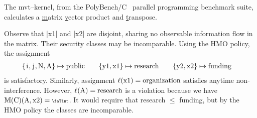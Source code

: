 \begin{example}
The mvt--kernel, from the {PolyBench/C}~\cite{polybenchc} parallel programming
benchmark suite, calculates a \underline{m}atrix \underline{v}ector product and
\underline{t}ranspose.

\begin{center}
\begin{minipage}{.55\textwidth}
\end{minipage}\hfill%
\begin{minipage}[b]{.40\textwidth}
\hfill\scalebox{.85}{$\begin{pNiceMatrix}[first-row,first-col]
& \prc|i|  & \prc|j| & \prc|N| & \prc|x1| & \prc|x2| & \prc|y1| & \prc|y2| & \prc|A| \\
\prc|i|   & \nv & \vi & \nv & \vi & \vi & \nv & \nv & \nv  \\
\prc|j|   & \nv & \nv & \nv & \vi & \vi & \nv & \nv & \nv  \\
\prc|N|   & \vi & \vi & \nv & \vi & \vi & \nv & \nv & \nv  \\
\prc|x1|  & \nv & \nv & \nv & \nv & \nv & \nv & \nv & \nv  \\
\prc|x2|  & \nv & \nv & \nv & \nv & \nv & \nv & \nv & \nv  \\
\prc|y1|  & \nv & \nv & \nv & \vi & \nv & \nv & \nv & \nv  \\
\prc|y2|  & \nv & \nv & \nv & \nv & \vi & \nv & \nv & \nv  \\
\prc|A|   & \nv & \nv & \nv & \vi & \vi & \nv & \nv & \nv  \\
\end{pNiceMatrix}$}
\end{minipage}
\end{center}

Observe that \prc|x1| and \prc|x2| are disjoint, sharing no observable
information flow in the matrix. Their security classes may be incomparable.
Using the HMO policy, the assignment
\begin{align*}
\{\prc|i|, \prc|j|, \prc|N|, \prc|A|\} &\mapsto \text{public} &&&
\{\prc|y1|, \prc|x1|\} & \mapsto \text{research} &&&
\{\prc|y2|, \prc|x2|\} & \mapsto \text{funding}
\end{align*}
is satisfactory.
Similarly, assignment \(\lvl{\prc|x1|} = \text{organization}\) satisfies anytime
non-interference. However, \(\lvl{\prc|A|} = \text{research}\) is a violation
because we have $\sfm{\prc|C|}(\prc|A|,\prc|x2|)=\vi$. It would require that
research $\leqslant$ funding, but by the HMO policy the classes are
incomparable.
 \end{example}

